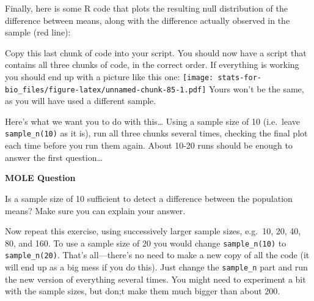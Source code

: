 \documentclass[]{book}
\newenvironment{Shaded}{\begin{snugshade}}{\end{snugshade}}
\newcommand{\KeywordTok}[1]{\textcolor[rgb]{0.13,0.29,0.53}{\textbf{{#1}}}}
\newcommand{\DataTypeTok}[1]{\textcolor[rgb]{0.13,0.29,0.53}{{#1}}}
\newcommand{\DecValTok}[1]{\textcolor[rgb]{0.00,0.00,0.81}{{#1}}}
\newcommand{\StringTok}[1]{\textcolor[rgb]{0.31,0.60,0.02}{{#1}}}
\newcommand{\CommentTok}[1]{\textcolor[rgb]{0.56,0.35,0.01}{\textit{{#1}}}}
\newcommand{\NormalTok}[1]{{#1}}
\begin{document}
Finally, here is some R code that plots the resulting null distribution
of the difference between means, along with the difference actually
observed in the sample (red line):

\begin{Shaded}
\end{Shaded}

Copy this last chunk of code into your script. You should now have a
script that contains all three chunks of code, in the correct order. If
everything is working you should end up with a picture like this one:
\texttt{[image: stats-for-bio\_files/figure-latex/unnamed-chunk-85-1.pdf]}
Yours won't be the same, as you will have used a different sample.

Here's what we want you to do with this\ldots{} Using a sample size of
10 (i.e.~leave \texttt{sample\_n(10)} as it is), run all three chunks
several times, checking the final plot each time before you run them
again. About 10-20 runs should be enough to answer the first
question\ldots{}

\begin{do-something}
\textbf{MOLE Question}

Is a sample size of 10 sufficient to detect a difference between the
population means? Make sure you can explain your answer.
\end{do-something}

Now repeat this exercise, using successively larger sample sizes,
e.g.~10, 20, 40, 80, and 160. To use a sample size of 20 you would
change \texttt{sample\_n(10)} to \texttt{sample\_n(20)}. That's
all---there's no need to make a new copy of all the code (it will end up
as a big mess if you do this). Just change the \texttt{sample\_n} part
and run the new version of everything several times. You might need to
experiment a bit with the sample sizes, but don;t make them much bigger
than about 200.
\end{document}
